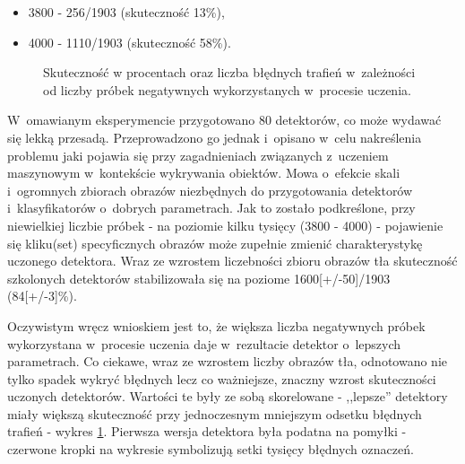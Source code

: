 \begin{itemize}
	\item 3800 - 256/1903 (skuteczność 13\%),
	\item 4000 - 1110/1903 (skuteczność 58\%).
\end{itemize}

\begin{figure}[h!]
	\begin{center}
	\end{center}
	\caption{Skuteczność w procentach oraz liczba błędnych trafień
		w~zależności od liczby próbek negatywnych wykorzystanych 
		w~procesie uczenia.}
	\label{chart:5000to2000_10000neg}
\end{figure}

W~omawianym eksperymencie przygotowano 80 detektorów, co może wydawać
się lekką przesadą. Przeprowadzono go jednak i~opisano w~celu nakreślenia
problemu jaki pojawia się przy zagadnieniach związanych
z~uczeniem maszynowym
w~kontekście wykrywania obiektów. Mowa o~efekcie skali 
i~ogromnych zbiorach obrazów niezbędnych do przygotowania
detektorów i~klasyfikatorów o~dobrych parametrach. 
Jak to zostało podkreślone, przy niewielkiej liczbie próbek - na poziomie kilku tysięcy 
(3800 - 4000) - pojawienie się kliku(set)
specyficznych obrazów może
zupełnie zmienić charakterystykę uczonego detektora. Wraz ze wzrostem liczebności zbioru
obrazów tła skuteczność szkolonych detektorów stabilizowała się na poziome 1600[+/-50]/1903
(84[+/-3]\%).

Oczywistym wręcz wnioskiem jest to, że większa liczba negatywnych
próbek wykorzystana w~procesie uczenia daje w~rezultacie detektor 
o~lepszych parametrach.
Co ciekawe, wraz ze wzrostem liczby obrazów tła, odnotowano nie tylko spadek 
wykryć błędnych lecz
co ważniejsze, znaczny wzrost skuteczności uczonych detektorów. Wartości te były ze sobą
skorelowane - ,,lepsze'' detektory miały większą skuteczność przy jednoczesnym mniejszym
odsetku błędnych trafień - wykres \ref{chart:5000to2000_10000neg}. Pierwsza
wersja detektora była podatna na pomyłki - czerwone kropki na wykresie 
symbolizują setki tysięcy błędnych oznaczeń.

